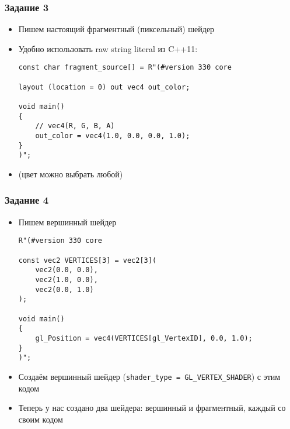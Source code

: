 \documentclass{beamer}
\begin{document}
\begin{frame}[fragile]
\frametitle{Задание 3}
\begin{itemize}
\item Пишем настоящий фрагментный (пиксельный) шейдер
\item Удобно использовать raw string literal из C++11:
\begin{verbatim}
const char fragment_source[] = R"(#version 330 core

layout (location = 0) out vec4 out_color;

void main()
{
    // vec4(R, G, B, A)
    out_color = vec4(1.0, 0.0, 0.0, 1.0);
}
)";
\end{verbatim}
\item (цвет можно выбрать любой)
\end{itemize}
\end{frame}

\begin{frame}[fragile]
\frametitle{Задание 4}
\fontsize{8pt}{8pt}\selectfont
\begin{itemize}
\item Пишем вершинный шейдер
\begin{verbatim}
R"(#version 330 core

const vec2 VERTICES[3] = vec2[3](
    vec2(0.0, 0.0),
    vec2(1.0, 0.0),
    vec2(0.0, 1.0)
);

void main()
{
    gl_Position = vec4(VERTICES[gl_VertexID], 0.0, 1.0);
}
)";
\end{verbatim}
\item Создаём вершинный шейдер (\verb|shader_type = GL_VERTEX_SHADER|) с этим кодом
\item Теперь у нас создано два шейдера: вершинный и фрагментный, каждый со своим кодом
\end{itemize}
\end{frame}
\end{document}
